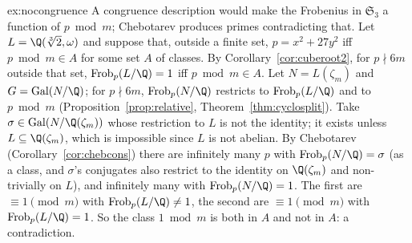 \begin{solution}{ex:nocongruence}
\idea A congruence description would make the Frobenius in $\mathfrak S_3$ a function of $p\bmod m$; Chebotarev produces primes contradicting that.
\writeup Let $L=\Q(\sqrt[3]2,\omega)$ and suppose that, outside a finite set, $p=x^2+27y^2$ iff $p\bmod m\in A$ for some set $A$ of classes. By
Corollary~\ref{cor:cuberoot2}, for $p\nmid6m$ outside that set, $\operatorname{Frob}_p(L/\Q)=1$ iff $p\bmod m\in A$. Let $N=L(\zeta_m)$ and
$G=\operatorname{Gal}(N/\Q)$; for $p\nmid6m$, $\operatorname{Frob}_p(N/\Q)$ restricts to $\operatorname{Frob}_p(L/\Q)$ and to $p\bmod m$ (Proposition~\ref{prop:relative},
Theorem~\ref{thm:cyclosplit}). Take $\sigma\in\operatorname{Gal}(N/\Q(\zeta_m))$ whose restriction to $L$ is not the identity; it exists unless $L\subseteq\Q(\zeta_m)$, which is
impossible since $L$ is not abelian. By Chebotarev (Corollary~\ref{cor:chebcons}) there are infinitely many $p$ with $\operatorname{Frob}_p(N/\Q)=\sigma$ (as a class,
and $\sigma$'s conjugates also restrict to the identity on $\Q(\zeta_m)$ and non-trivially on $L$), and infinitely many with $\operatorname{Frob}_p(N/\Q)=1$. The first
are $\equiv1\pmod m$ with $\operatorname{Frob}_p(L/\Q)\ne1$, the second are $\equiv1\pmod m$ with $\operatorname{Frob}_p(L/\Q)=1$. So the class $1\bmod m$ is both in $A$ and
not in $A$: a contradiction.
\end{solution}

